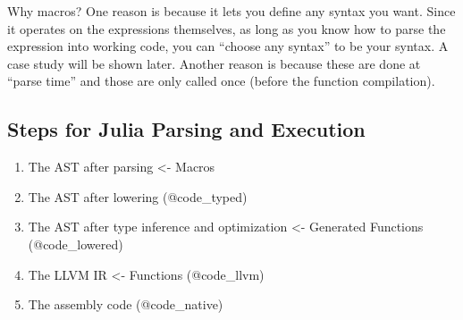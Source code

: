 \documentclass[11pt]{article}
\begin{document}
Why macros? One reason is because it lets you define any syntax you
want. Since it operates on the expressions themselves, as long as you
know how to parse the expression into working code, you can ``choose any
syntax'' to be your syntax. A case study will be shown later. Another
reason is because these are done at ``parse time'' and those are only
called once (before the function compilation).

    \subsection{Steps for Julia Parsing and
Execution}\label{steps-for-julia-parsing-and-execution}

\begin{enumerate}
\def\labelenumi{\arabic{enumi}.}
\itemsep1pt\parskip0pt
\item
  The AST after parsing \textless{}- Macros
\item
  The AST after lowering (@code\_typed)
\item
  The AST after type inference and optimization \textless{}- Generated
  Functions (@code\_lowered)
\item
  The LLVM IR \textless{}- Functions (@code\_llvm)
\item
  The assembly code (@code\_native)
\end{enumerate}


    
    
    
    
\end{document}

